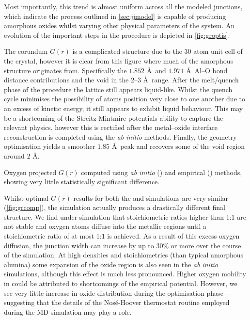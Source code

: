 Most importantly, this trend is almost uniform across all the modeled junctions, which indicate the process outlined in \cref{sec:jjmodel} is capable of producing amorphous oxides whilst varying other physical parameters of the system.
An evolution of the important steps in the procedure is depicted in \cref{fig:groptis}.

The corundum $G(r)$  is a complicated structure due to the 30 atom unit cell of the crystal, however it is clear from this figure where much of the amorphous structure originates from.
Specifically the $1.852$ \AA\ and $1.971$ \AA\ Al--O bond distance contributions and the void in the $2$--$3$ \AA\ range.
After the melt/quench phase of the procedure  the lattice still appears liquid-like.
Whilst the quench cycle minimises the possibility of atoms position very close to one another due to an excess of kinetic energy, it still appears to exhibit liquid behaviour.
This may be a shortcoming of the Streitz-Mintmire potentials ability to capture the relevant physics, however this is rectified after the metal--oxide interface reconstruction is completed  using the \textit{ab initio} methods.
Finally, the geometry optimisation  yields a smoother $1.85$ \AA\ peak and recovers some of the void region around $2$ \AA.

\phantom{push marginfigure}
\begin{marginfigure}
\resizebox{\marginparwidth}{!}{}
\caption[Radial Distribution Function Comparison]{\label{fig:grcomp}Oxygen projected $G(r)$ computed using \textit{ab initio} ()  and empirical ()  methods, showing very little statistically significant difference.}
\end{marginfigure}
\vspace{-1em}
Whilst optimal $G(r)$ results for both the  and  simulations are very similar (\cref{fig:grcomp}), the  simulation actually produces a drastically different final structure.
We find under  simulation that stoichiometric ratios higher than 1:1 are not stable and oxygen atoms diffuse into the metallic regions until a stoichiometric ratio of at most 1:1 is achieved.
As a result of this excess oxygen diffusion, the junction width can increase by up to 30\% or more over the course of the simulation.
At high densities and stoichiometries (than typical amorphous alumina) some expansion of the oxide region is also seen in the \textit{ab initio} simulations, although this effect is much less pronounced.
Higher oxygen mobility in  could be attributed to shortcomings of the empirical potential.  
However, we see very little increase in oxide distribution during the optimisation phase---suggesting that the details of the Nos\'{e}-Hoover thermostat routine employed during the MD simulation may play a role.

